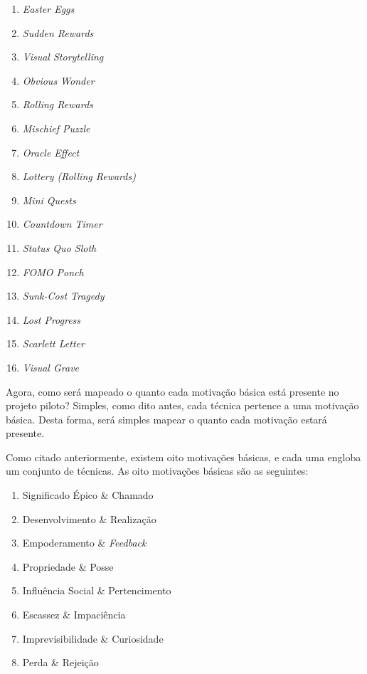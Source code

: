\begin{multicols}{2}
\begin{enumerate}
        \item \textit{Easter Eggs}
        \item \textit{Sudden Rewards}
        \item \textit{Visual Storytelling}
        \item \textit{Obvious Wonder}
        \item \textit{Rolling Rewards}
        \item \textit{Mischief Puzzle}
        \item \textit{Oracle Effect}
        \item \textit{Lottery (Rolling Rewards)}
        \item \textit{Mini Quests}
        \item \textit{Countdown Timer}
        \item \textit{Status Quo Sloth}
        \item \textit{FOMO Ponch}
        \item \textit{Sunk-Cost Tragedy}
        \item \textit{Lost Progress}
        \item \textit{Scarlett Letter}
        \item \textit{Visual Grave}
    \end{enumerate}
\end{multicols}

Agora, como será mapeado o quanto cada motivação básica está presente no projeto piloto? Simples, como dito antes,
cada técnica pertence a uma motivação básica. Desta forma, será simples mapear o quanto cada motivação estará presente.

Como citado anteriormente, existem oito motivações básicas, e cada uma engloba um conjunto de técnicas. As oito motivações básicas são as seguintes:

\begin{enumerate}
    \item Significado Épico \& Chamado
    \item Desenvolvimento \& Realização
    \item Empoderamento \& \textit{Feedback}
    \item Propriedade \& Posse
    \item Influência Social \& Pertencimento
    \item Escassez \& Impaciência
    \item Imprevisibilidade \& Curiosidade
    \item Perda \& Rejeição
\end{enumerate}

